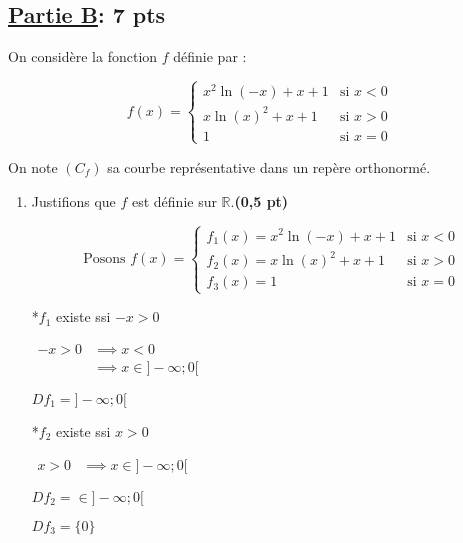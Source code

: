 \documentclass[12pt,a4paper]{article}
\begin{document}
\subsection*{\underline{\textbf{Partie B}}:\textbf{ 7 pts}}

On considère la fonction \( f \) définie par :

\[
    f(x) =
    \begin{cases}
        x^2 \ln(-x) + x + 1 & \text{si } x < 0 \\
        x \ln(x)^2 + x + 1  & \text{si } x > 0 \\
        1                   & \text{si } x = 0
    \end{cases}
\]

On note \( (C_f) \) sa courbe représentative dans un repère orthonormé.

\begin{enumerate}
    \item Justifions que \( f \) est définie sur \( \mathbb{R} \).\hfill \textbf{(0,5 pt)}

          \[ \text{Posons }
              f(x) =
              \begin{cases}
                  f_{1}(x)=x^2 \ln(-x) + x + 1 & \text{si } x < 0 \\
                  f_{2}(x)=x \ln(x)^2 + x + 1  & \text{si } x > 0 \\
                  f_{3}(x)=1                   & \text{si } x = 0
              \end{cases}
          \]

          *\(f_{1}\) existe ssi \(-x > 0\)

          \(
          \begin{aligned}
              -x > 0 & \implies x < 0            \\
                     & \implies x \in]-\infty;0[
          \end{aligned}
          \)

          \underline{\(Df_{1} = ]-\infty;0[ \)}

          *\(f_{2}\) existe ssi \(x > 0\)

          \(
          \begin{aligned}
              x > 0 & \implies x \in]-\infty;0[
          \end{aligned}
          \)

          \underline{\(Df_{2} = \in]-\infty;0[ \)}

          \underline{\(Df_{3} = \{0\} \)}


\end{enumerate}
\end{document}
